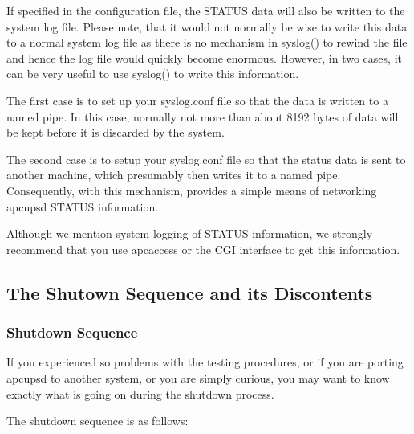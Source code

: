 {{{{{{{{{{{{{{{\label{index-Logging-Status-257}
\label{index-Status_002c-Logging-258}
If specified in the configuration file, the STATUS data will also be written
to the system log file. Please note, that it would not normally be wise to
write this data to a normal system log file as there is no mechanism in
syslog() to rewind the file and hence the log file would quickly become
enormous. However, in two cases, it can be very useful to use syslog() to
write this information.  

The first case is to set up your syslog.conf file so that the data is written
to a named pipe. In this case, normally not more than about 8192 bytes of data
will be kept before it is discarded by the system.  

The second case is to setup your syslog.conf file so that the status data is
sent to another machine, which presumably then writes it to a named pipe.
Consequently, with this mechanism, provides a simple means of networking
apcupsd STATUS information.  

Although we mention system logging of STATUS information, we strongly
recommend that you use apcaccess or the CGI interface to get this information.


\label{The-Shutown-Sequence-and-its-Discontents}

\subsection*{The Shutown Sequence and its Discontents}

\label{index-Shutdown-Sequence-259}

\label{Shutdown-Sequence-_003c1_003e}

\subsubsection*{Shutdown Sequence}

If you experienced so problems with the testing procedures, or if you are
porting apcupsd to another system, or you are simply curious, you may want to
know exactly what is going on during the shutdown process.  

The shutdown sequence is as follows:  

}}}}}}}}}}}}}}}
